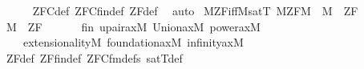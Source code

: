 \begin{isabellebody}
%
\isadelimproof
\ \ \ \ %
\endisadelimproof
%
\isatagproof
{}\isamarkupfalse%
\ ZFC{\isacharunderscore}{\kern0pt}def\ ZFC{\isacharunderscore}{\kern0pt}fin{\isacharunderscore}{\kern0pt}def\ ZF{\isacharunderscore}{\kern0pt}def\ \isamarkupfalse%
\ auto%
\endisatagproof
{\isafoldproof}%
%
\isadelimproof
\isanewline
%
\endisadelimproof
\isanewline
{}\isamarkupfalse%
\ M{\isacharunderscore}{\kern0pt}ZF{\isacharunderscore}{\kern0pt}iff{\isacharunderscore}{\kern0pt}M{\isacharunderscore}{\kern0pt}satT{\isacharcolon}{\kern0pt}\ {\isachardoublequoteopen}M{\isacharunderscore}{\kern0pt}ZF{\isacharparenleft}{\kern0pt}M{\isacharparenright}{\kern0pt}\ {\isasymlongleftrightarrow}\ {\isacharparenleft}{\kern0pt}M\ {\isasymTurnstile}\ ZF{\isacharparenright}{\kern0pt}{\isachardoublequoteclose}\isanewline
%
\isadelimproof
%
\endisadelimproof
%
\isatagproof
{}\isamarkupfalse%
\isanewline
\ \ \isamarkupfalse%
\ {\isachardoublequoteopen}M\ {\isasymTurnstile}\ ZF{\isachardoublequoteclose}\isanewline
\ \ \isamarkupfalse%
\isanewline
\ \ \isamarkupfalse%
\ fin{\isacharcolon}{\kern0pt}\ {\isachardoublequoteopen}upair{\isacharunderscore}{\kern0pt}ax{\isacharparenleft}{\kern0pt}{\isacharhash}{\kern0pt}{\isacharhash}{\kern0pt}M{\isacharparenright}{\kern0pt}{\isachardoublequoteclose}\ {\isachardoublequoteopen}Union{\isacharunderscore}{\kern0pt}ax{\isacharparenleft}{\kern0pt}{\isacharhash}{\kern0pt}{\isacharhash}{\kern0pt}M{\isacharparenright}{\kern0pt}{\isachardoublequoteclose}\ {\isachardoublequoteopen}power{\isacharunderscore}{\kern0pt}ax{\isacharparenleft}{\kern0pt}{\isacharhash}{\kern0pt}{\isacharhash}{\kern0pt}M{\isacharparenright}{\kern0pt}{\isachardoublequoteclose}\isanewline
\ \ \ \ {\isachardoublequoteopen}extensionality{\isacharparenleft}{\kern0pt}{\isacharhash}{\kern0pt}{\isacharhash}{\kern0pt}M{\isacharparenright}{\kern0pt}{\isachardoublequoteclose}\ {\isachardoublequoteopen}foundation{\isacharunderscore}{\kern0pt}ax{\isacharparenleft}{\kern0pt}{\isacharhash}{\kern0pt}{\isacharhash}{\kern0pt}M{\isacharparenright}{\kern0pt}{\isachardoublequoteclose}\ {\isachardoublequoteopen}infinity{\isacharunderscore}{\kern0pt}ax{\isacharparenleft}{\kern0pt}{\isacharhash}{\kern0pt}{\isacharhash}{\kern0pt}M{\isacharparenright}{\kern0pt}{\isachardoublequoteclose}\isanewline
\ \ \ \ \isamarkupfalse%
\ ZF{\isacharunderscore}{\kern0pt}def\ ZF{\isacharunderscore}{\kern0pt}fin{\isacharunderscore}{\kern0pt}def\ ZFC{\isacharunderscore}{\kern0pt}fm{\isacharunderscore}{\kern0pt}defs\ satT{\isacharunderscore}{\kern0pt}def\isanewline

\end{isabellebody}

